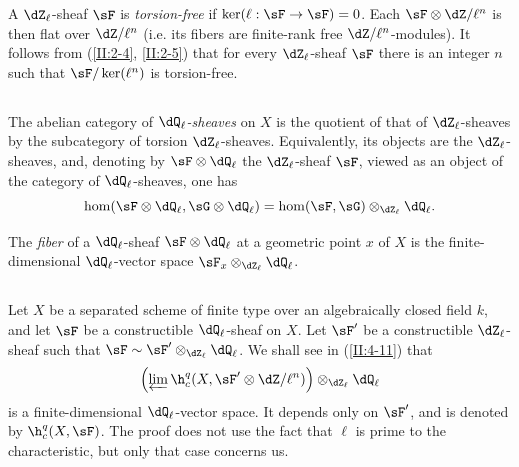 \documentclass[oneside]{book}
\begin{document}
A $\dZ_\ell$-sheaf $\sF$ is \emph{torsion-free} if
$\ker(\ell:\sF\to\sF) = 0$. Each $\sF\otimes\dZ/\ell^n$ is then flat over
$\dZ/\ell^n$ (i.e. its fibers are finite-rank free
$\dZ/\ell^n$-modules). It follows from (\ref{II:2-4}, \ref{II:2-5}) that for
every $\dZ_\ell$-sheaf $\sF$ there is an integer $n$ such that
$\sF/\ker(\ell^n)$ is torsion-free.






\subsection{}\label{II:2-9}

The abelian category of \emph{$\dQ_\ell$-sheaves} on $X$ is the quotient of
that of $\dZ_\ell$-sheaves by the subcategory of torsion
$\dZ_\ell$-sheaves. Equivalently, its objects are the $\dZ_\ell$-sheaves,
and, denoting by $\sF\otimes\dQ_\ell$ the $\dZ_\ell$-sheaf $\sF$, viewed as
an object of the category of $\dQ_\ell$-sheaves, one has
\[
  \hom(\sF\otimes\dQ_\ell,\sG\otimes\dQ_\ell) = \hom(\sF,\sG)\otimes_{\dZ_\ell}\dQ_\ell \text{.}
\]

The \emph{fiber} of a $\dQ_\ell$-sheaf $\sF\otimes\dQ_\ell$ at a geometric
point $x$ of $X$ is the finite-dimensional $\dQ_\ell$-vector space
$\sF_x\otimes_{\dZ_\ell}\dQ_\ell$.






\subsection{}\label{II:2-10}

Let $X$ be a separated scheme of finite type over an algebraically closed
field $k$, and let $\sF$ be a constructible $\dQ_\ell$-sheaf on $X$. Let
$\sF'$ be a constructible $\dZ_\ell$-sheaf such that
$\sF\sim \sF'\otimes_{\dZ_\ell}\dQ_\ell$. We shall see in
(\ref{II:4-11}) that
\[
  \left(\varprojlim \h_c^q(X,\sF'\otimes \dZ/\ell^n)\right)\otimes_{\dZ_\ell}\dQ_\ell
\]
is a finite-dimensional $\dQ_\ell$-vector space. It depends only on $\sF'$,
and is denoted by $\h_c^q(X,\sF)$. The proof does not use the fact that
$\ell$ is prime to the characteristic, but only that case concerns us.






\subsection{}\label{II:2-11}
\end{document}
